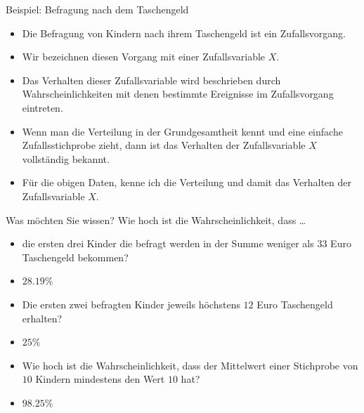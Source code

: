 \documentclass[usenames,dvipsnames,handout]{beamer}
\begin{document}
%

\begin{frame}{Beispiel: Befragung nach dem Taschengeld}
\begin{itemize}
\item{Die Befragung von Kindern nach ihrem Taschengeld ist ein Zufallsvorgang.}\pause
\item{Wir bezeichnen diesen Vorgang mit einer Zufallsvariable $X.$}\pause
\item{Das Verhalten dieser Zufallsvariable wird beschrieben durch Wahrscheinlichkeiten mit
denen bestimmte Ereignisse im Zufallsvorgang eintreten.}\pause
\item{Wenn man die Verteilung in der Grundgesamtheit kennt und eine einfache Zufallsstichprobe zieht,
dann ist das Verhalten der Zufallsvariable $X$ vollständig bekannt.}\pause
\item{Für die obigen Daten, kenne ich die Verteilung und damit das Verhalten der Zufallsvariable $X.$}
\end{itemize}
\end{frame}
\begin{frame}{Was möchten Sie wissen?}
Wie hoch ist die Wahrscheinlichkeit, dass \dots
\begin{itemize}
\item{die ersten drei Kinder die befragt werden in der Summe weniger als $33$ Euro Taschengeld bekommen?}\pause
\item{$28.19\%$}\pause
\item{Die ersten zwei befragten Kinder jeweils höchstens $12$ Euro Taschengeld erhalten?}\pause
\item{$25\%$}
\item{Wie hoch ist die Wahrscheinlichkeit, dass der Mittelwert einer Stichprobe von $10$ Kindern
mindestens den Wert $10$ hat?}\pause
\item{$98.25\%$}
\end{itemize}\pause

\end{frame}
\end{document}
